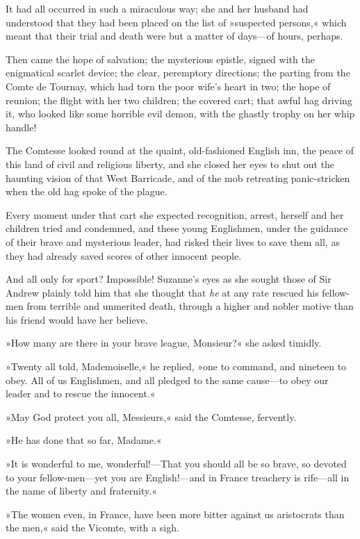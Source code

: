 It had all occurred in such a miraculous way; she and her husband had understood that they had been placed on the list of »suspected persons,« which meant that their trial and death were but a matter of days—of hours, perhaps.

Then came the hope of salvation; the mysterious epistle, signed with the enigmatical scarlet device; the clear, peremptory directions; the parting from the Comte de Tournay, which had torn the poor wife's heart in two; the hope of reunion; the flight with her two children; the covered cart; that awful hag driving it, who looked like some horrible evil demon, with the ghastly trophy on her whip handle!

The Comtesse looked round at the quaint, old-fashioned English inn, the peace of this land of civil and religious liberty, and she closed her eyes to shut out the haunting vision of that West Barricade, and of the mob retreating panic-stricken when the old hag spoke of the plague.

Every moment under that cart she expected recognition, arrest, herself and her children tried and condemned, and these young Englishmen, under the guidance of their brave and mysterious leader, had risked their lives to save them all, as they had already saved scores of other innocent people.

And all only for sport? Impossible! Suzanne's eyes as she sought those of Sir Andrew plainly told him that she thought that \textit{he} at any rate rescued his fellow-men from terrible and unmerited death, through a higher and nobler motive than his friend would have her believe.

»How many are there in your brave league, Monsieur?« she asked timidly.

»Twenty all told, Mademoiselle,« he replied, »one to command, and nineteen to obey. All of us Englishmen, and all pledged to the same cause—to obey our leader and to rescue the innocent.«

»May God protect you all, Messieurs,« said the Comtesse, fervently.

»He has done that so far, Madame.«

»It is wonderful to me, wonderful!—That you should all be so brave, so devoted to your fellow-men—yet you are English!—and in France treachery is rife—all in the name of liberty and fraternity.«

»The women even, in France, have been more bitter against us aristocrats than the men,« said the Vicomte, with a sigh.

